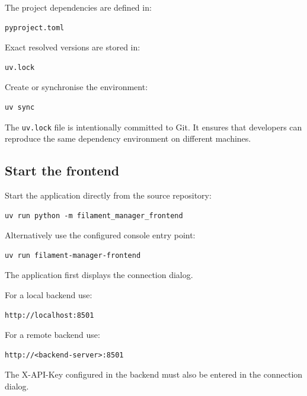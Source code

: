 \documentclass[a4paper,11pt]{article}
\begin{document}
The project dependencies are defined in:

\begin{lstlisting}
pyproject.toml
\end{lstlisting}

Exact resolved versions are stored in:

\begin{lstlisting}
uv.lock
\end{lstlisting}

Create or synchronise the environment:

\begin{lstlisting}
uv sync
\end{lstlisting}

\begin{infobox}
The \texttt{uv.lock} file is intentionally committed to Git. It ensures that
developers can reproduce the same dependency environment on different
machines.
\end{infobox}

\subsection{Start the frontend}

Start the application directly from the source repository:

\begin{lstlisting}
uv run python -m filament_manager_frontend
\end{lstlisting}

Alternatively use the configured console entry point:

\begin{lstlisting}
uv run filament-manager-frontend
\end{lstlisting}

The application first displays the connection dialog.

For a local backend use:

\begin{lstlisting}
http://localhost:8501
\end{lstlisting}

For a remote backend use:

\begin{lstlisting}
http://<backend-server>:8501
\end{lstlisting}

The X-API-Key configured in the backend must also be entered in the
connection dialog.

\end{document}
